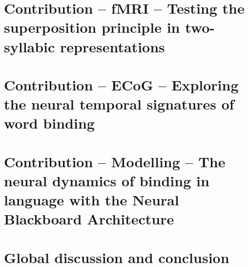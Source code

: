 \documentclass[twoside, justified, notoc, nobib, 
	nohyper]{tufte-book}
\begin{document}
\part{Contribution -- fMRI -- Testing the superposition principle in two-syllabic representations}
\cleardoublepage

\FloatBarrier

\FloatBarrier

\FloatBarrier
% 


\part{Contribution -- ECoG -- Exploring the neural temporal signatures of word binding}
\cleardoublepage
% 
% 
% 
% 


\part{Contribution -- Modelling -- The neural dynamics of binding in language with the Neural Blackboard Architecture}
\cleardoublepage

\FloatBarrier

%
%


\part{Global discussion and conclusion}
\cleardoublepage
%
%
\cleardoublepage


\backmatter 



\clearpage
%
\end{document}
